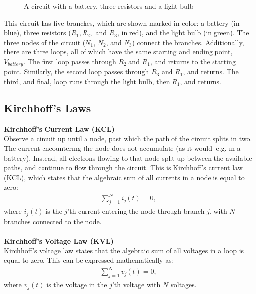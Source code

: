 \begin{figure}[H]
 
 \caption{A circuit with a battery, three resistors and a light bulb}
\end{figure}

\noindent This circuit has five branches, which are shown marked in color: a battery (in blue), three resistors ($R_1, R_2,$ and $R_3$, in red), and the light bulb (in green). The three nodes of the circuit ($N_1$, $N_2$, and $N_3$) connect the branches. Additionally, there are three loops, all of which have the same starting and ending point, $V_{battery}$. The first loop passes through $R_2$ and $R_1$, and returns to the starting point. Similarly, the second loop passes through $R_3$ and $R_1$, and returns. The third, and final, loop runs through the light bulb, then $R_1$, and returns. 

\subsection{Kirchhoff's Laws}\label{Klaws}
\textbf{Kirchhoff's Current Law (KCL)}
\\
Observe a circuit up until a node, past which the path of the circuit splits in two. The current encountering the node does not accumulate (as it would, e.g. in a battery). Instead, all electrons flowing to that node split up between the available paths, and continue to flow through the circuit. This is Kirchhoff’s current law (KCL), which states that the algebraic sum of all currents in a node is equal to zero:
\begin{align}
\sum_{j=1}^{N} i_{j}(t) = 0,
\end{align}
where $i_{j}(t)$ is the $j$'th current entering the node through branch $j$, with $N$ branches connected to the node. \cite[page~32]{bcircuit}
\\
\\
\textbf{Kirchhoff's Voltage Law (KVL)}
\\
Kirchhoff's voltage law states that the algebraic sum of all voltages in a loop is equal to zero. This can be expressed mathematically as:
\begin{align}
\sum_{j=1}^{N} v_{j}(t) = 0,
\end{align}
where $v_{j}(t)$ is the voltage in the $j$'th voltage with $N$ voltages. \citep[page~34]{bcircuit}\\

